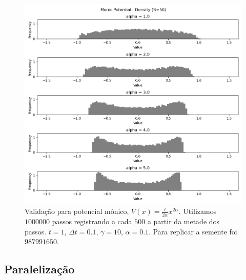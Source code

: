 \begin{center}
	\begin{figure}
		\includegraphics[scale=1]{images/validationArticleMonic}
		\caption{Validação para potencial mônico, $V(x) = \frac{t}{2 \alpha} x^{2\alpha}$. Utilizamos $1000000$ passos registrando a cada $500$ a partir da metade dos passos. $t = 1$, $\Delta t = 0.1$, $\gamma = 10$, $\alpha = 0.1$. Para replicar a semente foi $987991650$.}
	\end{figure}
\end{center}

\subsection{Paralelização}

